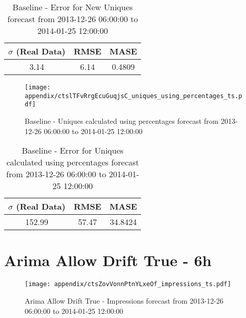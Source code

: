 \begin{table}[H]
\centering
\footnotesize
\begin{tabular}{ccc}
$\sigma$ (Real Data) & RMSE & MASE   \\ \hline
3.14 & 6.14 & 0.4809 \\
\end{tabular}

\vspace{0.5cm}

\caption{
Baseline - Error for New Uniques forecast from 2013-12-26 06:00:00 to 2014-01-25 12:00:00}
\end{table}

\begin{figure}[H] \begin{center} \leavevmode
\texttt{[image: appendix/ctslTFvRrgEcuGuqjsC\_uniques\_using\_percentages\_ts.pdf]} \caption{
Baseline - Uniques calculated using percentages forecast from 2013-12-26 06:00:00 to 2014-01-25 12:00:00} \label{fig:appendix/ctslTFvRrgEcuGuqjsC_uniques_using_percentages_ts.pdf} \end{center}
\end{figure}

\begin{table}[H]
\centering
\footnotesize
\begin{tabular}{ccc}
$\sigma$ (Real Data) & RMSE & MASE   \\ \hline
152.99 & 57.47 & 34.8424 \\
\end{tabular}

\vspace{0.5cm}

\caption{
Baseline - Error for Uniques calculated using percentages forecast from 2013-12-26 06:00:00 to 2014-01-25 12:00:00}
\end{table}

\section{Arima Allow Drift True - 6h}
\begin{figure}[H] \begin{center} \leavevmode
\texttt{[image: appendix/ctsZovVonnPtnYLxeOf\_impressions\_ts.pdf]} \caption{
Arima Allow Drift True - Impressions forecast from 2013-12-26 06:00:00 to 2014-01-25 12:00:00} \label{fig:appendix/ctsZovVonnPtnYLxeOf_impressions_ts.pdf} \end{center}
\end{figure}


